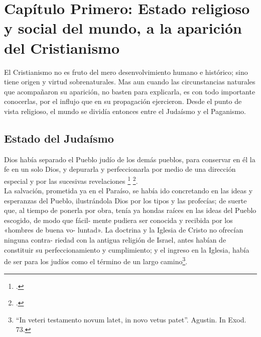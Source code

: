 \raggedbottom{} \documentclass[12pt, a4paper]{book}
\begin{document}
\chapter{Capítulo Primero: Estado religioso y social del mundo, a la aparición del Cristianismo}
El Cristianismo no es fruto del mero desenvolvimiento humano e histórico; sino tiene origen y virtud sobrenaturales. Mas aun cuando las circunstancias naturales que acompañaron su aparición, no basten para explicarla, es con todo importante conocerlas, por el influjo que en su propagación ejercieron. Desde el punto de vista religioso, el mundo se dividía entonces entre el Judaísmo y el Paganismo.
\section{Estado del Judaísmo}
Dios había separado el Pueblo judío de los demás pueblos, para conservar en él la fe en un solo Dios, y depurarla y perfeccionarla por medio de una dirección especial y por las sucesivas revelaciones \footcite{Flavius1856Opera} \footcite{Schurer1910Geschichte}. \\
La salvación, prometida ya en el Paraíso, se había ido concretando en las ideas y esperanzas del Pueblo, ilustrándola Dios por los tipos y las profecías; de suerte que, al tiempo de ponerla por obra, tenía ya hondas raíces en las ideas del Pueblo escogido, de modo que fácil- mente pudiera ser conocida y recibida por los «hombres de buena vo- luntad». La doctrina y la Iglesia de Cristo no ofrecían ninguna contra- riedad con la antigua religión de Israel, antes habían de constituir su perfeccionamiento y cumplimiento; y el ingreso en la Iglesia, había de ser para los judíos como el término de un largo camino\footnote{``In veteri testamento novum latet, in novo vetus patet''. Agustin. In Exod. 73.}.
\end{document}
